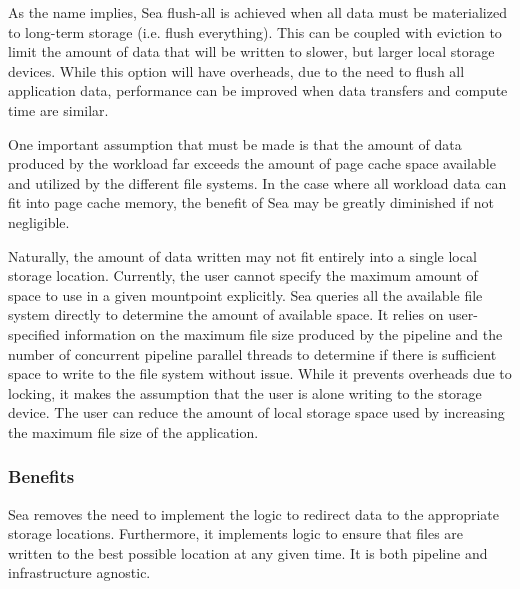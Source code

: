 As the name implies, Sea flush-all is achieved when all data must be
materialized to long-term storage (i.e. flush everything). This can be coupled
with eviction to limit the amount of data that will be written to slower, but
larger local storage devices. While this option will have overheads, due to the
need to flush all application data, performance can be improved when data
transfers and compute time are similar. 


One important assumption that must be made is that the amount of data produced
by the workload far exceeds the amount of page cache space available and
utilized by the different file systems. In the case where all workload data can
fit into page cache memory, the benefit of Sea may be greatly diminished if not
negligible.

Naturally, the amount of data written may not fit entirely into a single local
storage location. Currently, the user cannot specify the maximum amount of space
to use in a given mountpoint explicitly. Sea queries all the available file
system directly to determine the amount of available space. It relies on
user-specified information on the maximum file size produced by the pipeline and
the number of concurrent pipeline parallel threads to determine if there is
sufficient space to write to the file system without issue. While it prevents
overheads due to locking, it makes the assumption that the user is alone writing
to the storage device. The user can reduce the amount of local storage space
used by increasing the maximum file size of the application.



\subsubsection{Benefits}
Sea removes the need to implement the logic to redirect data to the appropriate
storage locations. Furthermore, it implements logic to ensure that files are
written to the best possible location at any given time. It is both pipeline and
infrastructure agnostic.

